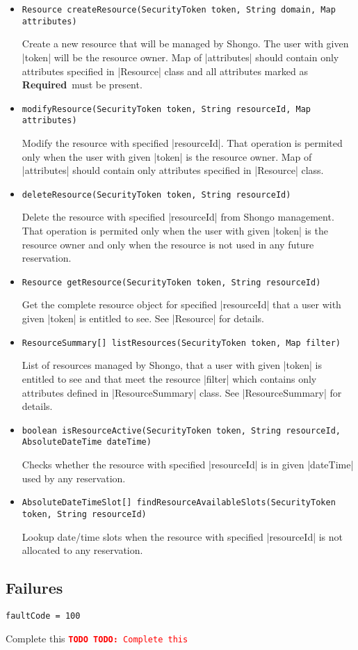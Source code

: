\documentclass[a4paper]{report}
\newenvironment{Api}{\begin{itemize}}{\end{itemize}}
\newcommand{\ApiCode}[1]{\lstinline[style=styleApi]|#1|}
\newcommand{\ApiItem}[1]{\item #1 %

}
\newcommand{\ApiCmd}[1]{\ApiItem{\ApiCode{#1}}}
\newcommand{\ApiRequired}{{\color{blue!50!black}\textbf{Required}}}
\newenvironment{ApiFailures}{\begin{compactitem}}{\end{compactitem}}
\newcommand{\ApiFailure}[1]{\ApiItem{\ApiCode{faultCode = #1}}}
\newcommand{\TODO}[1]{%
\def\empty{}%
\def\prvniparametr{#1}%
\ifx\prvniparametr\empty%
\begingroup\tt\textcolor{red}{\noindent\textbf{TODO}}\endgroup
\else%
\begingroup\tt\textcolor{red}{\noindent\textbf{TODO:}\ #1}\endgroup
\fi%
}
\begin{document}
\begin{Api}

\ApiCmd{Resource createResource(SecurityToken token, String domain, Map attributes)}
Create a new resource that will be managed by Shongo. The user with given |token| will be the resource owner. Map of |attributes| should contain only attributes specified in |Resource| class and all attributes marked as \ApiRequired\ must be present.

\ApiCmd{modifyResource(SecurityToken token, String resourceId, Map attributes)}
Modify the resource with specified |resourceId|. That operation is permited only when the user with given |token| is the resource owner. Map of |attributes| should contain only attributes specified in |Resource| class.

\ApiCmd{deleteResource(SecurityToken token, String resourceId)}
Delete the resource with specified |resourceId| from Shongo management. That operation is permited only when the user with given |token| is the resource owner and only when the resource is not used in any future reservation.

\ApiCmd{Resource getResource(SecurityToken token, String resourceId)}
Get the complete resource object for specified |resourceId| that a user with given |token| is entitled to see. See |Resource| for details.

\ApiCmd{ResourceSummary[] listResources(SecurityToken token, Map filter)}
List of resources managed by Shongo, that a user with given |token| is entitled to see and that meet the resource |filter| which contains only attributes defined in |ResourceSummary| class. See |ResourceSummary| for details.

\ApiCmd{boolean isResourceActive(SecurityToken token, String resourceId, AbsoluteDateTime dateTime)}
Checks whether the resource with specified |resourceId| is in given |dateTime| used by any reservation.

\ApiCmd{AbsoluteDateTimeSlot[] findResourceAvailableSlots(SecurityToken token, String resourceId)}
Lookup date/time slots when the resource with specified |resourceId| is not allocated to any reservation.


\end{Api}

\subsection{Failures}

\begin{ApiFailures}
\ApiFailure{100} 
\end{ApiFailures}
\TODO{Complete this}
\end{document}
